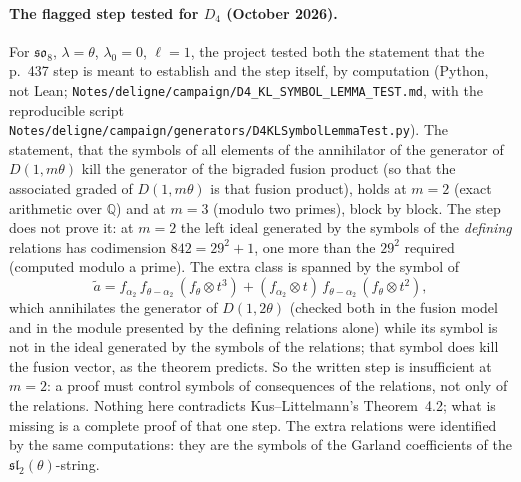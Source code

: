 \paragraph{The flagged step tested for $D_4$ (October 2026).} For $\mathfrak{so}_8$, $\lambda=\theta$, $\lambda_0=0$, $\ell=1$, the
project tested both the statement that the p.~437 step is meant to establish and the step itself, by computation (Python, not
Lean; \texttt{Notes/deligne/campaign/D4\_KL\_SYMBOL\_LEMMA\_TEST.md}, with the reproducible script
\texttt{Notes/deligne/campaign/generators/D4KLSymbolLemmaTest.py}). The statement, that the symbols of all elements of the
annihilator of the generator of $D(1,m\theta)$ kill the generator of the bigraded fusion product (so that the associated graded
of $D(1,m\theta)$ is that fusion product), holds at $m=2$ (exact arithmetic over $\mathbb Q$) and at $m=3$ (modulo two primes),
block by block. The step does not prove it: at $m=2$ the left ideal generated by the symbols of the \emph{defining} relations has
codimension $842=29^2+1$, one more than the $29^2$ required (computed modulo a prime). The extra class is spanned by the symbol of
\begin{equation*}
  \tilde a=f_{\alpha_2}\,f_{\theta-\alpha_2}\,(f_\theta\otimes t^3)+(f_{\alpha_2}\otimes t)\,f_{\theta-\alpha_2}\,(f_\theta\otimes t^2),
\end{equation*}
which annihilates the generator of $D(1,2\theta)$ (checked both in the fusion model and in the module presented by the defining
relations alone) while its symbol is not in the ideal generated by the symbols of the relations; that symbol does kill the fusion
vector, as the theorem predicts. So the written step is insufficient at $m=2$: a proof must control symbols of consequences of the
relations, not only of the relations. Nothing here contradicts Kus--Littelmann's Theorem~4.2; what is missing is a complete proof
of that one step. The extra relations were identified by the same computations: they are the symbols of the Garland coefficients of
the $\mathfrak{sl}_2(\theta)$-string.

